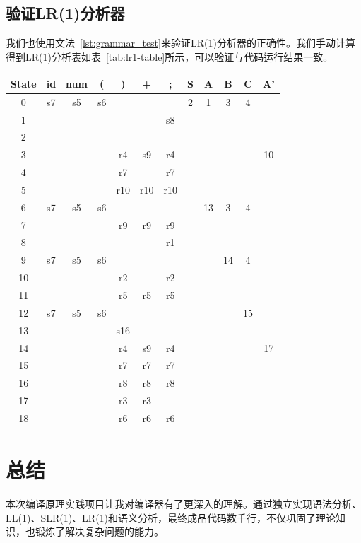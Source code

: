 \documentclass[UTF8,openany]{ctexbook}
\begin{document}
\section{验证LR(1)分析器}
我们也使用文法~\ref{lst:grammar_test}来验证LR(1)分析器的正确性。我们手动计算得到LR(1)分析表如表~\ref{tab:lr1-table}所示，可以验证与代码运行结果一致。

\begin{table}[H]
\small
\centering
\caption{文法~\ref{lst:grammar_test}的LR(1)分析表}
\label{tab:lr1-table}
\begin{longtable}{|c|c|c|c|c|c|c||c|c|c|c|c|}
    \hline
    \textbf{State} & \textbf{id} & \textbf{num} & \textbf{(} & \textbf{)} & \textbf{+} & \textbf{;} & \textbf{S} & \textbf{A} & \textbf{B} & \textbf{C} & \textbf{A'} \\
    \hline
    0  & s7  & s5  & s6  &     &     &     & 2 & 1 & 3 & 4 &   \\
    1  &     &     &     &     &     & s8  &   &   &   &   &   \\
    2  &     &     &     &     &     &     &   &   &   &   &   \\
    3  &     &     &     & r4  & s9  & r4  &   &   &   &   & 10 \\
    4  &     &     &     & r7  &     & r7  &   &   &   &   &   \\
    5  &     &     &     & r10 & r10 & r10 &   &   &   &   &   \\
    6  & s7  & s5  & s6  &     &     &     &   & 13 & 3 & 4 &   \\
    7  &     &     &     & r9  & r9  & r9  &   &   &   &   &   \\
    8  &     &     &     &     &     & r1  &   &   &   &   &   \\
    9  & s7  & s5  & s6  &     &     &     &   &   & 14 & 4 &   \\
    10 &     &     &     & r2  &     & r2  &   &   &   &   &   \\
    11 &     &     &     & r5  & r5  & r5  &   &   &   &   &   \\
    12 & s7  & s5  & s6  &     &     &     &   &   &   & 15 &   \\
    13 &     &     &     & s16 &     &     &   &   &   &   &   \\
    14 &     &     &     & r4  & s9  & r4  &   &   &   &   & 17 \\
    15 &     &     &     & r7  & r7  & r7  &   &   &   &   &   \\
    16 &     &     &     & r8  & r8  & r8  &   &   &   &   &   \\
    17 &     &     &     & r3  & r3  &     &   &   &   &   &   \\
    18 &     &     &     & r6  & r6  & r6  &   &   &   &   &   \\
    \hline
\end{longtable}
\end{table}

\chapter{总结}
\label{sec:conclusion}

本次编译原理实践项目让我对编译器有了更深入的理解。通过独立实现语法分析、LL(1)、SLR(1)、LR(1)和语义分析，最终成品代码数千行，不仅巩固了理论知识，也锻炼了解决复杂问题的能力。



\end{document}
